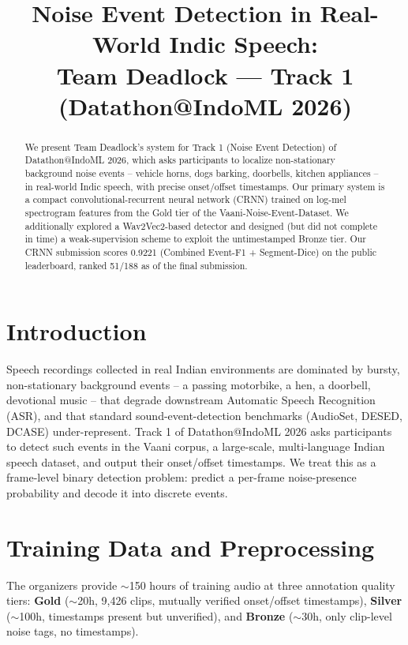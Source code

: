 \documentclass[conference]{IEEEtran}
\begin{document}
\title{Noise Event Detection in Real-World Indic Speech:\\Team Deadlock — Track 1 (Datathon@IndoML 2026)}

\author{
}

\maketitle

\begin{abstract}
We present Team Deadlock's system for Track 1 (Noise Event Detection) of
Datathon@IndoML 2026, which asks participants to localize non-stationary
background noise events -- vehicle horns, dogs barking, doorbells, kitchen
appliances -- in real-world Indic speech, with precise onset/offset
timestamps. Our primary system is a compact convolutional-recurrent neural
network (CRNN) trained on log-mel spectrogram features from the Gold tier of
the Vaani-Noise-Event-Dataset. We additionally explored a Wav2Vec2-based
detector and designed (but did not complete in time) a weak-supervision
scheme to exploit the untimestamped Bronze tier. Our CRNN submission scores
0.9221 (Combined Event-F1 + Segment-Dice) on the public leaderboard, ranked
51/188 as of the final submission.
\end{abstract}

\section{Introduction}
Speech recordings collected in real Indian environments are dominated by
bursty, non-stationary background events -- a passing motorbike, a hen, a
doorbell, devotional music -- that degrade downstream Automatic Speech
Recognition (ASR), and that standard sound-event-detection benchmarks
(AudioSet, DESED, DCASE) under-represent. Track 1 of Datathon@IndoML 2026
asks participants to detect such events in the Vaani corpus, a large-scale,
multi-language Indian speech dataset, and output their onset/offset
timestamps. We treat this as a frame-level binary detection problem: predict
a per-frame noise-presence probability and decode it into discrete events.

\section{Training Data and Preprocessing}
The organizers provide $\sim$150 hours of training audio at three annotation
quality tiers: \textbf{Gold} ($\sim$20h, 9{,}426 clips, mutually verified
onset/offset timestamps), \textbf{Silver} ($\sim$100h, timestamps present but
unverified), and \textbf{Bronze} ($\sim$30h, only clip-level noise tags, no
timestamps).
\end{document}
